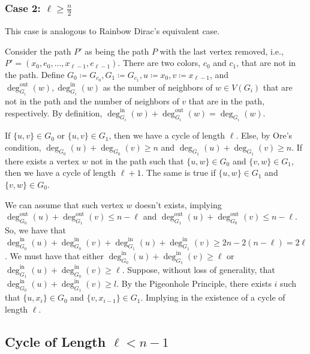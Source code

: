 \subsubsection{Case 2: \( \ell \geq \frac{n}{2} \)}

This case is analogous to Rainbow Dirac's equivalent case.

Consider the path $P'$ as being the path $P$ with the last vertex removed, i.e., $P' = (x_0, e_0, \dots, x_{\ell-1}, e_{\ell-1})$.
There are two colors, $c_0$ and $c_1$, that are not in the path. Define 
\(G_0 \coloneqq G_{c_0}, G_1 \coloneqq G_{c_1}, u \coloneqq x_0, v \coloneqq x_{\ell-1}\), and 
\( \deg^{\text{out}}_{G_i}(w), \deg^{\text{in}}_{G_i}(w) \) as the number of neighbors of \(w \in V(G_i)\) that are not in the path
and the number of neighbors of \(v\) that are in the path, respectively.
By definition, \( \deg^{\text{in}}_{G_i}(w) +  \deg^{\text{out}}_{G_i}(w) = \deg_{G_i}(w) \).

If \( \{u, v\} \in G_0 \) or \( \{u, v\} \in G_1 \), then we have a cycle of length \( \ell \).
Else, by Ore's condition, \( \deg_{G_0}(u) + \deg_{G_0}(v) \geq n \) and \( \deg_{G_1}(u) + \deg_{G_1}(v) \geq n \).
If there exists a vertex \(w\) not in the path such that \( \{u, w\} \in G_0 \) and \( \{v, w\} \in G_1 \), 
then we have a cycle of length \( \ell + 1 \). The same is true if \( \{u, w\} \in G_1 \) and \( \{v, w\} \in G_0 \).

We can assume that such vertex \(w\) doesn't exists, implying 
\( \deg^{\text{out}}_{G_0}(u) + \deg^{\text{out}}_{G_1}(v) \leq n - \ell \) and
\( \deg^{\text{out}}_{G_1}(u) + \deg^{\text{out}}_{G_0}(v) \leq n - \ell \). 
So, we have that \( \deg^{\text{in}}_{G_0}(u) + \deg^{\text{in}}_{G_0}(v) + 
\deg^{\text{in}}_{G_1}(u) + \deg^{\text{in}}_{G_1}(v)  \geq 2 n - 2 ( n - \ell  ) = 2 \ell \). We must have that 
either \( \deg^{\text{in}}_{G_0}(u) + \deg^{\text{in}}_{G_1}(v) \geq \ell \) or 
\( \deg^{\text{in}}_{G_1}(u) + \deg^{\text{in}}_{G_0}(v) \geq \ell \).
Suppose, without loss of generality, that \( \deg^{\text{in}}_{G_0}(u) + \deg^{\text{in}}_{G_1}(v) \geq l \).
By the Pigeonhole Principle, there exists \(i\) such that 
\( \{u, x_i\} \in G_0 \) and \( \{v, x_{i-1}\} \in G_1 \).
Implying in the existence of a cycle of length \( \ell \).

\subsection{Cycle of Length $\ell < n - 1$}

